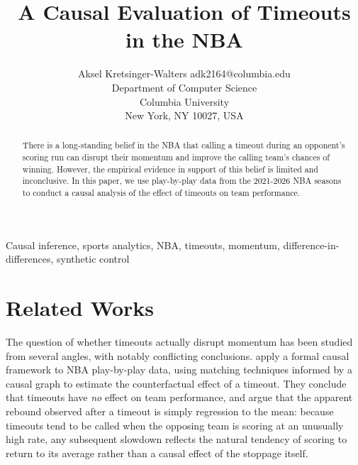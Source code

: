 \documentclass[twoside,11pt]{article}
\begin{document}
\title{A Causal Evaluation of Timeouts in the NBA}

\author{\name Aksel Kretsinger-Walters \email adk2164@columbia.edu \\
		\addr Department of Computer Science\\
		Columbia University\\
New York, NY 10027, USA}


\maketitle

\begin{abstract}%
		There is a long-standing belief in the NBA that calling a timeout during an opponent's scoring run can
		disrupt their momentum and improve the calling team's chances of winning. However, the empirical evidence
		in support of this belief is limited and inconclusive. In this paper, we use play-by-play data from the
		2021-2026 NBA seasons to conduct a causal analysis of the effect of timeouts on team performance.
\end{abstract}

\begin{keywords}
		Causal inference, sports analytics, NBA, timeouts, momentum, difference-in-differences, synthetic control
\end{keywords}


\section{Related Works}

The question of whether timeouts actually disrupt momentum has been studied from several angles, with notably
conflicting conclusions. \citet{assis2020stop} apply a formal causal framework to NBA play-by-play data,
using matching techniques informed by a causal graph to estimate the counterfactual effect of a timeout. They
conclude that timeouts have \emph{no} effect on team performance, and argue that the apparent rebound
observed after a timeout is simply regression to the mean: because timeouts tend to be called when the
opposing team is scoring at an unusually high rate, any subsequent slowdown reflects the natural tendency of
scoring to return to its average rather than a causal effect of the stoppage itself.
\end{document}
